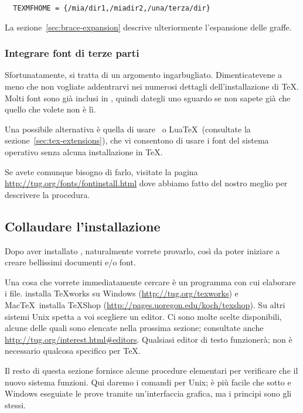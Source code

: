 \documentclass{article}
\begin{document}
\begin{verbatim}
  TEXMFHOME = {/mia/dir1,/miadir2,/una/terza/dir}
\end{verbatim}

La sezione~\ref{sec:brace-expansion} descrive ulteriormente l'espansione
delle graffe.


\subsubsection{Integrare font di terze parti}

Sfortunatamente, si tratta di un argomento ingarbugliato. Dimenticatevene
a meno che non vogliate addentrarvi nei numerosi dettagli
dell'installazione di \TeX{}. Molti font sono già inclusi in \TL, quindi
dategli uno sguardo se non sapete già che quello che volete non è lì.

Una possibile alternativa è quella di usare \XeTeX\ o Lua\TeX\ (consultate
la sezione~\ref{sec:tex-extensions}), che vi consentono di usare i font
del sistema operativo senza alcuna installazione in \TeX.

Se avete comunque bisogno di farlo, visitate la pagina
\url{http://tug.org/fonts/fontinstall.html} dove abbiamo fatto del nostro
meglio per descrivere la procedura.


\subsection{Collaudare l'installazione}
\label{sec:test-install}

Dopo aver installato \TL, naturalmente vorrete provarlo, così da poter
iniziare a creare bellissimi documenti e\slash o font.

Una cosa che vorrete immediatamente cercare è un programma con cui
elaborare i file. \TL{} installa \TeX{}works su Windows
(\url{http://tug.org/texworks}) e Mac\TeX\ installa TeXShop
(\url{http://pages.uoregon.edu/koch/texshop}). Su altri sistemi Unix
spetta a voi scegliere un editor. Ci sono molte scelte disponibili, alcune
delle quali sono elencate nella prossima sezione; consultate anche
\url{http://tug.org/interest.html#editors}. Qualsiasi editor di testo
funzionerà; non è necessario qualcosa specifico per \TeX.

Il resto di questa sezione fornisce alcune procedure elementari per verificare che il
nuovo sistema funzioni. Qui daremo i comandi per Unix; è più facile che
sotto \MacOSX e Windows eseguiate le prove tramite un'interfaccia grafica,
ma i principi sono gli stessi.
\end{document}
